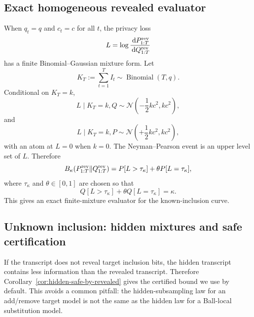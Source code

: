 \documentclass[conference,compsoc]{IEEEtran}
\DeclareMathOperator{\Bin}{Binomial}
\newcommand{\N}{\mathcal{N}}
\newcommand{\dd}{\,\mathrm d}
\begin{document}
\subsection{Exact homogeneous revealed evaluator}
\label{sec:homogeneous-evaluator}

When $q_t=q$ and $c_t=c$ for all $t$, the privacy loss
\[
L=\log\frac{\dd P_{1:T}^{\rm rev}}{\dd Q_{1:T}^{\rm rev}}
\]
has a finite Binomial--Gaussian mixture form.  Let
\[
K_T:=\sum_{t=1}^T I_t\sim\Bin(T,q).
\]
Conditional on $K_T=k$,
\[
L\mid K_T=k,Q
\sim
\N\!\left(-\frac12kc^2,kc^2\right),
\]
and
\[
L\mid K_T=k,P
\sim
\N\!\left(+\frac12kc^2,kc^2\right),
\]
with an atom at $L=0$ when $k=0$.  The Neyman--Pearson event is an upper level
set of $L$.  Therefore
\[
B_\kappa(P_{1:T}^{\rm rev}\|Q_{1:T}^{\rm rev})
=
P[L>\tau_\kappa]+\theta P[L=\tau_\kappa],
\]
where $\tau_\kappa$ and $\theta\in[0,1]$ are chosen so that
\[
Q[L>\tau_\kappa]+\theta Q[L=\tau_\kappa]=\kappa.
\]
This gives an exact finite-mixture evaluator for the known-inclusion curve.

\subsection{Unknown inclusion: hidden mixtures and safe certification}
\label{sec:hidden-inclusion}

If the transcript does not reveal target inclusion bits, the hidden transcript
contains less information than the revealed transcript.  Therefore
Corollary~\ref{cor:hidden-safe-by-revealed} gives the certified bound we use by
default.  This avoids a common pitfall: the hidden-subsampling law for an
add/remove target model is not the same as the hidden law for a Ball-local
substitution model.
\end{document}
